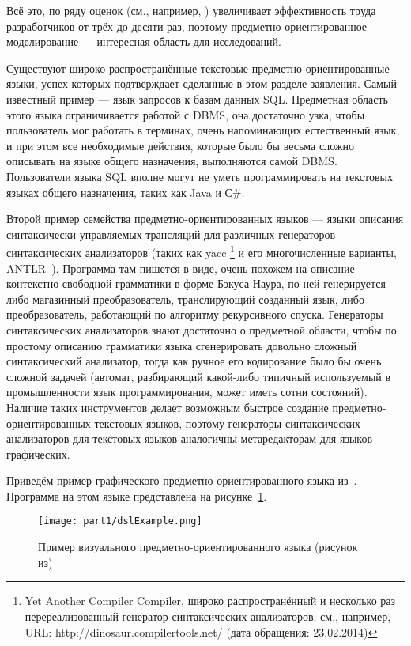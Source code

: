 Всё это, по ряду оценок (см., например, \cite{kieburtz1996software, kelly2000visual, gray2003examination})
увеличивает эффективность труда разработчиков от трёх до десяти раз, поэтому 
предметно-ориентированное моделирование --- интересная область для исследований.

Существуют широко распространённые текстовые предметно-ориентированные языки, 
успех которых подтверждает сделанные в этом разделе заявления. Самый известный 
пример --- язык запросов к базам данных \ac{SQL}. Предметная область этого языка 
ограничивается работой с \ac{DBMS}, она достаточно узка, чтобы пользователь мог 
работать в терминах, очень напоминающих естественный язык, и при этом все 
необходимые действия, которые было бы весьма сложно описывать на языке общего 
назначения, выполняются самой \ac{DBMS}. Пользователи языка \ac{SQL} вполне могут не уметь 
программировать на текстовых языках общего назначения, таких как Java и С\#. 

Второй пример семейства предметно-ориентированных языков --- языки описания 
синтаксически управляемых трансляций для различных генераторов синтаксических 
анализаторов (таких как yacc%
\footnote{Yet Another Compiler Compiler, широко распространённый и несколько раз перереализованный генератор 
синтаксических анализаторов, см., например, URL: http://dinosaur.compilertools.net/ (дата обращения: 23.02.2014)}
 и его многочисленные варианты, ANTLR~\cite{antlr}). Программа там пишется в виде, очень 
похожем на описание контекстно-свободной грамматики в форме Бэкуса-Наура, по ней генерируется 
либо магазинный преобразователь, транслирующий созданный язык, либо преобразователь, работающий 
по алгоритму рекурсивного спуска. Генераторы синтаксических анализаторов знают 
достаточно о предметной области, чтобы по простому описанию грамматики языка 
сгенерировать довольно сложный синтаксический анализатор, тогда как ручное его 
кодирование было бы очень сложной задачей (автомат, разбирающий какой-либо 
типичный используемый в промышленности язык программирования, может иметь сотни 
состояний). Наличие таких инструментов делает возможным быстрое создание 
предметно-ориентированных текстовых языков, поэтому генераторы синтаксических 
анализаторов для текстовых языков аналогичны метаредакторам для языков 
графических.

Приведём пример графического предметно-ориентированного языка из~\cite{kelly2008domain}.
Программа на этом языке представлена на рисунке~\ref{dslExample}.

\begin{figure} [ht]
	\begin{center}
		\texttt{[image: part1/dslExample.png]}
		\caption{Пример визуального предметно-ориентированного языка (рисунок из\cite{kelly2008domain})}
		\label{dslExample}
	\end{center}
\end{figure}

